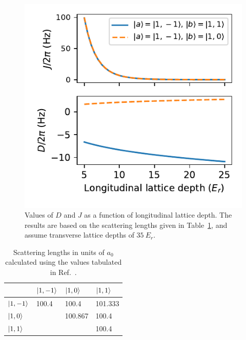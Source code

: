 \documentclass[aps,prl,twocolumn,superscriptaddress]{revtex4-1}
\newcounter{comment}
\newcommand{\comment}[2][]{\todo[color=red!100!green!33, #1]{#2}}
\begin{document}
\begin{figure}
    \centering
    \includegraphics[width = \columnwidth]{figs/hamiltonian-parameters/J-and-D-vs-lattice-depth.pdf}
    \caption{Values of $D$ and $J$ as a function of longitudinal lattice depth. The results are based on the scattering lengths given in Table~\ref{tab:scattering-lengths}, and assume transverse lattice depths of $35~E_r$.}
    \label{fig:j-and-d-vs-lattice}
\end{figure}

\begin{table}
    \centering
    \begin{ruledtabular}
    \begin{tabular}{l|lll}
                     & $\ket{1,-1}$ & $\ket{1,0}$ & $\ket{1,1}$ \\ \hline
        $\ket{1,-1}$ & 100.4        & 100.4       & 101.333     \\
        $\ket{1,0}$  &              & 100.867     & 100.4       \\
        $\ket{1,1}$  &              &             & 100.4       \\
    \end{tabular}
    \end{ruledtabular}
    \caption{Scattering lengths in units of $a_0$ calculated using the values tabulated in Ref.~\cite{Stamper-Kurn13}.}
    \label{tab:scattering-lengths}
\end{table}
\end{document}
